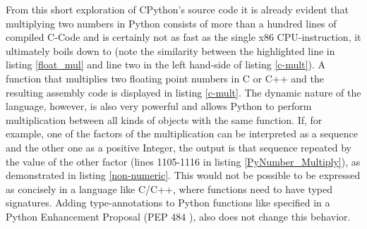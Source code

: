 \documentclass[english,11pt,a4paper,table]{article} %
\begin{document}
From this short exploration of CPython's source code it is already evident that multiplying two numbers in Python consists of more than a hundred lines of compiled C-Code and is certainly not as fast as the single x86 CPU-instruction, it ultimately boils down to (note the similarity between the highlighted line in listing \ref{float_mul} and line two in the left hand-side of listing \ref{c-mult}).
A function that multiplies two floating point numbers in C or C++ and the resulting assembly code is displayed in listing \ref{c-mult}.
The dynamic nature of the language, however, is also very powerful and allows Python to perform multiplication between all kinds of objects with the same function.
If, for example, one of the factors of the multiplication can be interpreted as a sequence and the other one as a positive Integer, the output is that sequence repeated by the value of the other factor (lines 1105-1116 in listing \ref{PyNumber_Multiply}), as demonstrated in listing \ref{non-numeric}. This would not be possible to be expressed as concisely in a language like C/C++, where functions need to have typed signatures. Adding type-annotations to Python functions like specified in a Python Enhancement Proposal (PEP 484 \cite{pep484}), also does not change this behavior.



\end{document}
